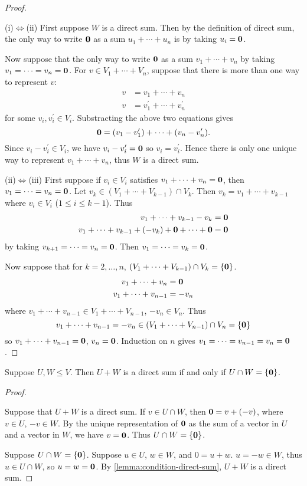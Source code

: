 \begin{proof} \

(i)$\iff$(ii) First suppose $W$ is a direct sum. Then by the definition of direct sum, the only way to write $\vb{0}$ as a sum $u_1+\cdots+u_n$ is by taking $u_i=\vb{0}$.

Now suppose that the only way to write $\vb{0}$ as a sum $v_1+\cdots+v_n$ by taking $v_1=\cdots=v_n=\vb{0}$. For $v\in V_1+\cdots+V_n$, suppose that there is more than one way to represent $v$:
\begin{align*}
v&=v_1+\cdots+v_n\\
v&=v_1^\prime+\cdots+v_n^\prime
\end{align*}
for some $v_i,v_i^\prime\in V_i$. Substracting the above two equations gives
\[\vb{0}=(v_1-v_1^\prime)+\cdots+(v_n-v_n^\prime).\]
Since $v_i-v_i^\prime\in V_i$, we have $v_i-v_i^\prime=\vb{0}$ so $v_i=v_i^\prime$. Hence there is only one unique way to represent $v_1+\cdots+v_n$, thus $W$ is a direct sum.

(ii)$\iff$(iii) First suppose if $v_i\in V_i$ satisfies $v_1+\cdots+v_n=\vb{0}$, then $v_1=\cdots=v_n=\vb{0}$. Let $v_k\in(V_1+\cdots+V_{k-1})\cap V_k$. Then $v_k=v_1+\cdots+v_{k-1}$ where $v_i\in V_i$ ($1\le i\le k-1$). Thus
\begin{align*}
v_1+\cdots+v_{k-1}-v_k&=\vb{0}\\
v_1+\cdots+v_{k-1}+(-v_k)+\vb{0}+\cdots+\vb{0}&=\vb{0}
\end{align*}
by taking $v_{k+1}=\cdots=v_n=\vb{0}$. Then $v_1=\cdots=v_k=\vb{0}$.

Now suppose that for $k=2,\dots,n$, $(V_1+\cdots+V_{k-1})\cap V_k=\{\vb{0}\}$.
\begin{align*}
v_1+\cdots+v_n&=\vb{0}\\
v_1+\cdots+v_{n-1}&=-v_n
\end{align*}
where $v_1+\cdots+v_{n-1}\in V_1+\cdots+V_{n-1}$, $-v_n\in V_n$. Thus
\[v_1+\cdots+v_{n-1}=-v_n\in(V_1+\cdots+V_{n-1})\cap V_n=\{\vb{0}\}\]
so $v_1+\cdots+v_{n-1}=\vb{0}$, $v_n=\vb{0}$. Induction on $n$ gives $v_1=\cdots=v_{n-1}=v_n=\vb{0}$.
\end{proof}

\begin{proposition}
Suppose $U,W\le V$. Then $U+W$ is a direct sum if and only if $U\cap W=\{\vb{0}\}$.
\end{proposition}

\begin{proof} \

\fbox{$\implies$} Suppose that $U+W$ is a direct sum. If $v\in U\cap W$, then $\vb{0}=v+(-v)$, where $v\in U$, $-v\in W$. By the unique representation of $\vb{0}$ as the sum of a vector in $U$ and a vector in $W$, we have $v=\vb{0}$. Thus $U\cap W=\{\vb{0}\}$.

\fbox{$\impliedby$} Suppose $U\cap W=\{\vb{0}\}$. Suppose $u\in U$, $w\in W$, and $0=u+w$. $u=-w\in W$, thus $u\in U\cap W$, so $u=w=\vb{0}$. By \cref{lemma:condition-direct-sum}, $U+W$ is a direct sum.
\end{proof}
\pagebreak

